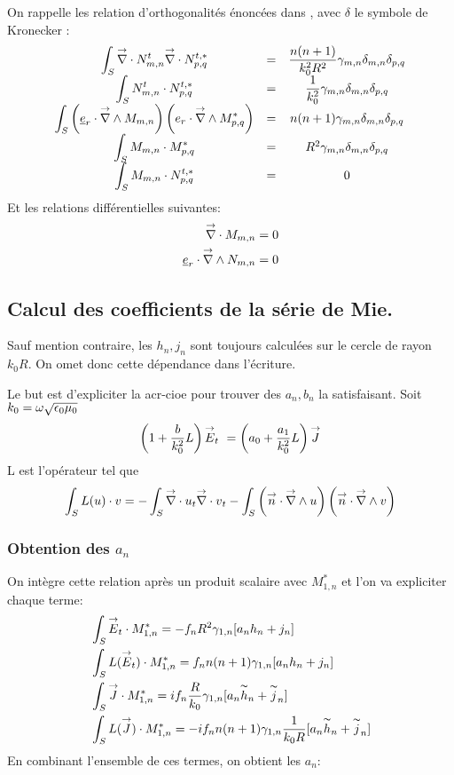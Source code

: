 On rappelle les relation d'orthogonalités énoncées dans \cite{marceaux_high-order_2000}, avec \(\delta\) le symbole de Kronecker :
\[
  \begin{matrix}
    \displaystyle\int_S {\overset{\rightarrow}{\nabla}}\cdot N_{m,n}^t {\overset{\rightarrow}{\nabla}}\cdot N_{p,q}^{t,*} &=& \dfrac{n(n+1)}{k_0^2 R^2} \gamma_{m,n} \delta_{m,n} \delta_{p,q}\\
    \displaystyle\int_S N_{m,n}^t \cdot N_{p,q}^{t,*} &=& \dfrac{1}{k_0^2}\gamma_{m,n}\delta_{m,n} \delta_{p,q}\\
    \displaystyle\int_S \left(\underline{e}_r \cdot {\overset{\rightarrow}{\nabla}}\wedge M_{m,n}\right)\left( e_r \cdot {\overset{\rightarrow}{\nabla}}\wedge  M_{p,q}^{*}\right) &=& n(n+1) \gamma_{m,n} \delta_{m,n} \delta_{p,q}\\
    \displaystyle\int_S M_{m,n} \cdot M_{p,q}^{*} &=& R^2 \gamma_{m,n} \delta_{m,n} \delta_{p,q}\\
    \displaystyle\int_S M_{m,n} \cdot N_{p,q}^{t,*} &=& 0
  \end{matrix}
\]
Et les relations différentielles suivantes:
\begin{align*}
  {\overset{\rightarrow}{\nabla}}\cdot M_{m,n} &=0 \\
  \underline{e}_r \cdot {\overset{\rightarrow}{\nabla}}\wedge N_{m,n} &= 0
\end{align*}

\subsection{Calcul des coefficients de la série de Mie.}
\begin{tcolorbox}
Sauf mention contraire, les \(h_n,j_n\) sont toujours calculées sur le cercle de rayon \(k_0R\). On omet donc cette dépendance dans l'écriture.
\end{tcolorbox}
Le but est d'expliciter la \gls{acr-cioe} pour trouver des \(a_n, b_n\) la satisfaisant.
Soit \(k_0 = \omega\sqrt{\epsilon_0\mu_0}\)
\begin{equation}
  \label{eq:CIOE} \left(1+\dfrac{b}{k_0^2}L\right){\overset{\rightarrow}{E}}_t\ = \left(a_0 + \dfrac{a_1}{k_0^2}L\right){\overset{\rightarrow}{J}}
\end{equation}
L est l'opérateur tel que 
\[
  \int_{S} L(u)\cdot v = - \int_{S} {{\overset{\rightarrow}{\nabla}}\cdot u}_t {{\overset{\rightarrow}{\nabla}}\cdot v}_t - \int_{S}\left({\overset{\rightarrow}{n}} \cdot {\overset{\rightarrow}{\nabla}}\wedge u\right)\left( {\overset{\rightarrow}{n}} \cdot {\overset{\rightarrow}{\nabla}}\wedge v\right)
\]
\subsubsection{Obtention des \(a_n\)}
On intègre cette relation après un produit scalaire avec \(M_{1,n}^{*}\) et l'on va expliciter chaque terme:
\begin{align*}
  &\int_S {\overset{\rightarrow}{E}}_t\cdot M_{1,n}^{*} = - f_n R^2 \gamma_{1,n}[a_n h_n + j_n]\\
  &\int_S L({\overset{\rightarrow}{E}}_t)\cdot M_{1,n}^{*} =  f_n n(n+1)\gamma_{1,n}[a_n h_n + j_n]\\
  &\int_S {\overset{\rightarrow}{J}} \cdot M_{1,n}^{*} =  i f_n \dfrac{R}{k_0} \gamma_{1,n}[a_n \overset{\thicksim}{h}_n + \overset{\thicksim}{j}_n]\\
  &\int_S L({\overset{\rightarrow}{J}}) \cdot M_{1,n}^{*} =  - i f_n n(n+1) \gamma_{1,n}\dfrac{1}{k_0 R}[a_n \overset{\thicksim}{h}_n + \overset{\thicksim}{j}_n]\\
\end{align*}
En combinant l'ensemble de ces termes, on obtient les \(a_n\):

